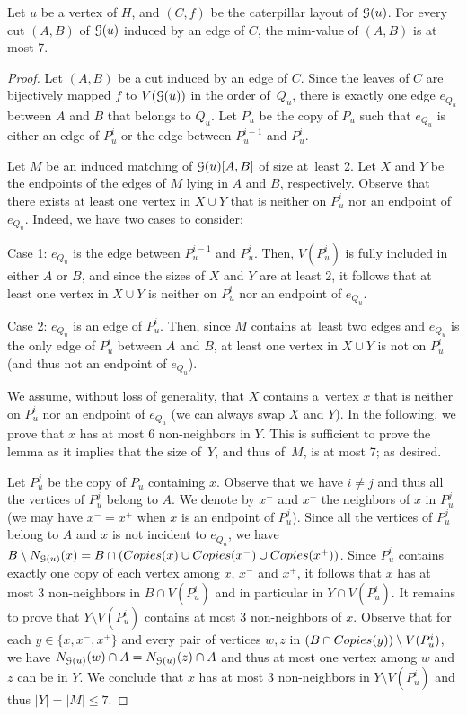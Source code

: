 \documentclass[a4paper,UKenglish,cleveref,hyperref,autoref]{lipics-v2021}
\renewcommand{\leq}{\leqslant}
\begin{document}
\begin{lemma}\label{lem:mim-value:gadget}
Let $u$ be a vertex of $H$, and $(C,f)$ be the caterpillar layout of $\mathcal G(u)$. 
For every cut $(A,B)$ of $\mathcal G(u)$ induced by an edge of $C$, the mim-value of $(A,B)$ is at most 7.
\end{lemma}
\begin{proof}
	Let $(A,B)$ be a cut induced by an edge of $C$.
	Since the leaves of $C$ are bijectively mapped $f$ to $V(\mathcal G(u))$ in the order of~$Q_u$, there is exactly one edge $e_{Q_u}$ between $A$ and $B$ that belongs to $Q_u$.
	Let $P_u^i$ be the copy of $P_u$ such that $e_{Q_u}$ is either an edge of $P_u^i$ or the edge between $P_u^{i-1}$ and $P_u^{i}$.
	
	Let $M$ be an induced matching of $\mathcal G(u)[A,B]$ of size at~least 2.
	Let $X$ and $Y$ be the endpoints of the edges of $M$ lying in $A$ and $B$, respectively.
	Observe that there exists at least one vertex in $X\cup Y$ that is neither on $P_u^i$ nor an endpoint of $e_{Q_u}$.
	Indeed, we have two cases to consider:
	\begin{compactitem}
		\item Case 1: $e_{Q_u}$ is the edge between $P_u^{i-1}$ and $P_u^{i}$. Then, $V(P_u^i)$ is fully included in either $A$ or $B$, and since the sizes of $X$ and $Y$ are at least 2, it follows that at least one vertex in $X\cup Y$ is neither on $P_u^i$ nor an endpoint of $e_{Q_u}$.
		\item Case 2: $e_{Q_u}$ is an edge of $P_u^i$. Then, since $M$ contains at~least two edges and $e_{Q_u}$ is the only edge of $P_u^i$ between $A$ and $B$, at least one vertex in $X\cup Y$ is not on $P_u^i$ (and thus not an endpoint of $e_{Q_u}$).
	\end{compactitem}
	We assume, without loss of generality, that $X$ contains a~vertex $x$ that is neither on $P_u^i$ nor an endpoint of $e_{Q_u}$ (we can always swap $X$ and $Y$).
	In the following, we prove that $x$ has at most 6 non-neighbors in $Y$.
        This is sufficient to prove the lemma as it implies that the size of~$Y$, and thus of~$M$, is at most 7; as desired.
	
	Let $P^j_u$ be the copy of $P_u$ containing $x$.
	Observe that we have $i\neq j$ and thus all the vertices of $P_u^j$ belong to $A$.
	We denote by $x^-$ and $x^+$ the neighbors of $x$ in $P_u^j$ (we may have $x^-=x^+$ when $x$ is an endpoint of $P_u^j$).
	Since all the vertices of $P_u^j$ belong to $A$ and $x$ is not incident to $e_{Q_u}$, we have $B \setminus N_{\gad(u)}(x) = B\cap (\copies(x)\cup \copies(x^-)\cup \copies(x^+))$. 
	Since $P_u^i$ contains exactly one copy of each vertex among $x$, $x^-$ and $x^+$, it follows that $x$ has at most 3 non-neighbors in $B\cap V(P_u^i)$ and in particular in $Y\cap V(P_u^i)$.
	It remains to prove that $Y\setminus V(P_u^i)$ contains at most 3 non-neighbors of $x$.
	Observe that for each $y\in \{x,x^-, x^+\}$ and every pair of vertices $w,z$ in $(B\cap \copies(y)) \setminus V(P_u^i)$, we have $N_{\mathcal G(u)}(w) \cap A = N_{\mathcal G(u)}(z)\cap A$ and thus at most one vertex among $w$ and $z$ can be in $Y$.
	We conclude that $x$ has at most 3 non-neighbors in $Y\setminus V(P_u^i)$ and thus $|Y|=|M| \leq 7$.	
\end{proof}
\end{document}
